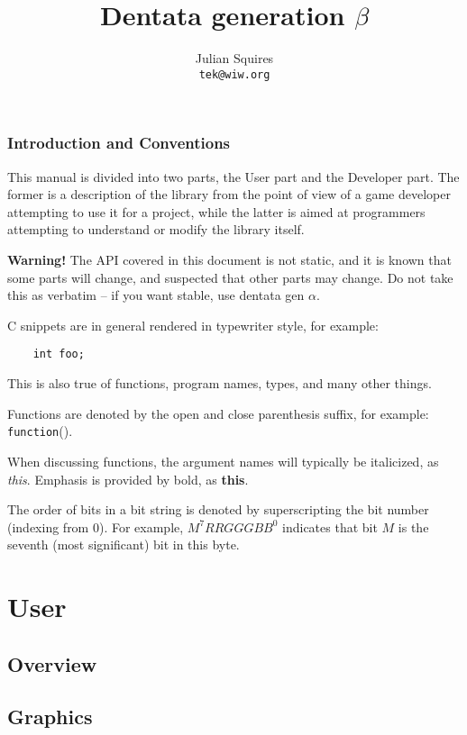 \documentclass{book}
\title{Dentata generation $\beta$}
\author{Julian Squires \\ {\tt tek@wiw.org}}
\begin{document}
\maketitle
\tableofcontents
\newpage

\section{Introduction and Conventions}
\label{sec:mainintro}

This manual is divided into two parts, the User part and the Developer
part. The former is a description of the library from the point of
view of a game developer attempting to use it for a project, while the
latter is aimed at programmers attempting to understand or modify the
library itself.

{\bf Warning!} The API covered in this document is not static, and
it is known that some parts will change, and suspected that other
parts may change. Do not take this as verbatim -- if you want stable,
use dentata gen $\alpha$.

C snippets are in general rendered in typewriter style, for example:
\begin{verbatim}
    int foo;
\end{verbatim}

This is also true of functions, program names, types, and many other
things.

Functions are denoted by the open and close parenthesis suffix, for
example: {\tt function}().

When discussing functions, the argument names will typically be italicized,
as {\it this}. Emphasis is provided by bold, as {\bf this}.

The order of bits in a bit string is denoted by superscripting the bit
number (indexing from 0). For example, $M^{7}RRGGGBB^0$ indicates that
bit $M$ is the seventh (most significant) bit in this byte.

\part{User}
\label{part:user}

\chapter{Overview}
\label{chap:overview}



\chapter{Graphics}
\label{chap:graphics}
\end{document}
